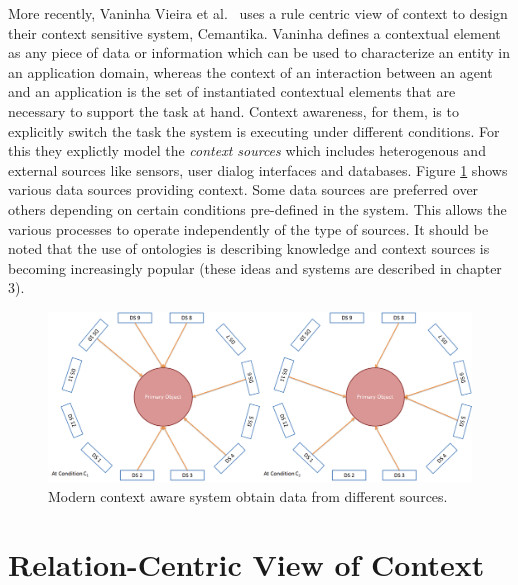 More recently, Vaninha Vieira et al.\ \cite{vieira2011designing} uses a rule centric view of context to design their context sensitive system, Cemantika. Vaninha defines a contextual element as any piece of data or information which can be used to characterize an entity in an application domain, whereas the context of an interaction between an agent and an application is the set of instantiated contextual elements that are necessary to support the task at hand. Context awareness, for them, is to explicitly switch the task the system is executing under different conditions. For this they explictly model the \textit{context sources} which includes heterogenous and  external sources like sensors, user dialog interfaces and databases. Figure \ref{fig:va-def} shows various data sources providing context. Some data sources are preferred over others depending on certain conditions pre-defined in the system. This allows the various processes to operate independently of the type of sources. It should be noted that the use of ontologies is describing knowledge and context sources is becoming increasingly popular (these ideas and systems are described in chapter 3).

\begin{figure}[t]
\centering
\includegraphics[width=\textwidth]{media/chapter2/va.png}
\caption{Modern context aware system obtain data from different sources.}
\label{fig:va-def}
\end{figure}

\section{Relation-Centric View of Context}

